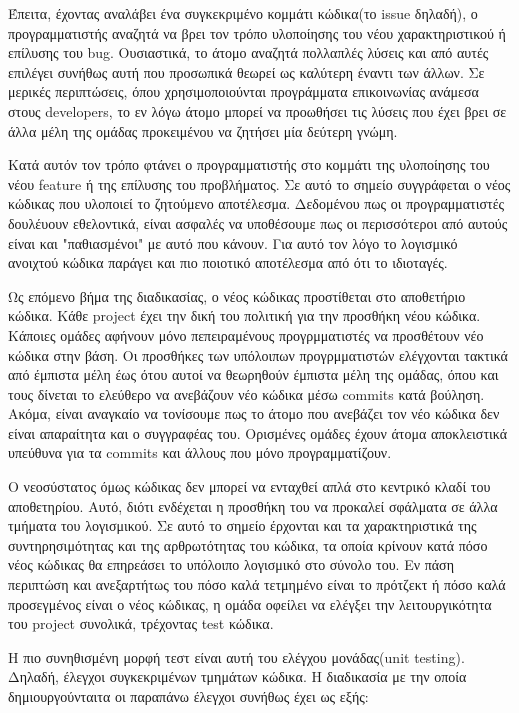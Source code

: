 \documentclass[a4paper, 11pt]{article}
\begin{document}
{{Έπειτα, έχοντας αναλάβει ένα συγκεκριμένο κομμάτι κώδικα(το \textlatin{issue} δηλαδή), ο προγραμματιστής αναζητά να βρει τον τρόπο υλοποίησης του νέου χαρακτηριστικού ή επίλυσης του \textlatin{bug}. Ουσιαστικά, το άτομο αναζητά πολλαπλές λύσεις και από αυτές επιλέγει συνήθως αυτή που προσωπικά θεωρεί ως καλύτερη έναντι των άλλων. Σε μερικές περιπτώσεις, όπου χρησιμοποιούνται προγράμματα επικοινωνίας ανάμεσα στους \textlatin{developers}, το εν λόγω άτομο μπορεί να προωθήσει τις λύσεις που έχει βρει σε άλλα μέλη της ομάδας προκειμένου να ζητήσει μία δεύτερη γνώμη.

Κατά αυτόν τον τρόπο φτάνει ο προγραμματιστής στο κομμάτι της υλοποίησης του νέου \textlatin{feature} ή της επίλυσης του προβλήματος. Σε αυτό το σημείο συγγράφεται ο νέος κώδικας που υλοποιεί το ζητούμενο αποτέλεσμα. Δεδομένου πως οι προγραμματιστές δουλέυουν εθελοντικά, είναι ασφαλές να υποθέσουμε πως οι περισσότεροι από αυτούς είναι και "παθιασμένοι" με αυτό που κάνουν. Για αυτό τον λόγο το λογισμικό ανοιχτού κώδικα παράγει και πιο ποιοτικό αποτέλεσμα από ότι το ιδιοταγές.

Ως επόμενο βήμα της διαδικασίας, ο νέος κώδικας προστίθεται στο αποθετήριο κώδικα. Κάθε \textlatin{project} έχει την δική του πολιτική για την προσθήκη νέου κώδικα. Κάποιες ομάδες αφήνουν μόνο πεπειραμένους προγρμματιστές να προσθέτουν νέο κώδικα στην βάση. Οι προσθήκες των υπόλοιπων προγρμματιστών ελέγχονται τακτικά από έμπιστα μέλη έως ότου αυτοί να θεωρηθούν έμπιστα μέλη της ομάδας, όπου και τους δίνεται το ελεύθερο να ανεβάζουν νέο κώδικα μέσω \textlatin{commits} κατά βούληση. Ακόμα, είναι αναγκαίο να τονίσουμε πως το άτομο που ανεβάζει τον νέο κώδικα δεν είναι απαραίτητα και ο συγγραφέας του. Ορισμένες ομάδες έχουν άτομα αποκλειστικά υπεύθυνα για τα \textlatin{commits} και άλλους που μόνο προγραμματίζουν.

Ο νεοσύστατος όμως κώδικας δεν μπορεί να ενταχθεί απλά στο κεντρικό κλαδί του αποθετηρίου. Αυτό, διότι ενδέχεται η προσθήκη του να προκαλεί σφάλματα σε άλλα τμήματα του λογισμικού. Σε αυτό το σημείο έρχονται και τα χαρακτηριστικά της συντηρησιμότητας και της αρθρωτότητας του κώδικα, τα οποία κρίνουν κατά πόσο νέος κώδικας θα επηρεάσει το υπόλοιπο λογισμικό στο σύνολο του. Εν πάση περιπτώση και ανεξαρτήτως του πόσο καλά τετμημένο είναι το πρότζεκτ ή πόσο καλά προσεγμένος είναι ο νέος κώδικας, η ομάδα οφείλει να ελέγξει την λειτουργικότητα του \textlatin{project} συνολικά, τρέχοντας \textlatin{test} κώδικα.

Η πιο συνηθισμένη μορφή τεστ είναι αυτή του ελέγχου μονάδας(\textlatin{unit testing}). Δηλαδή, έλεγχοι συγκεκριμένων τμημάτων κώδικα. Η διαδικασία με την οποία δημιουργούνταιτα οι παραπάνω έλεγχοι συνήθως έχει ως εξής:

}}
\end{document}
